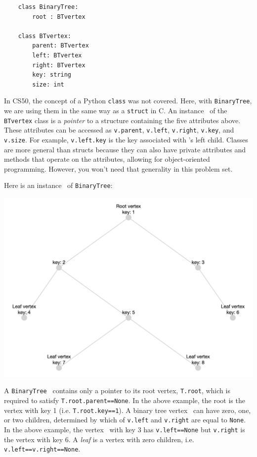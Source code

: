 \documentclass[11pt]{article}
\begin{document}
\begin{enumerate}
 \begin{verbatim}
    class BinaryTree:
        root : BTvertex
 
    class BTvertex:
        parent: BTvertex
        left: BTvertex
        right: BTvertex
        key: string
        size: int
 \end{verbatim}

 In CS50, the concept of a Python \texttt{class} was not covered. Here, with \texttt{BinaryTree}, we are using them in the same way as a \texttt{struct} in C. An instance \btv\  of the \texttt{BTvertex} class is a {\em pointer} to a structure containing the five attributes above. These attributes can be accessed as \texttt{v.parent}, \texttt{v.left}, \texttt{v.right}, \texttt{v.key}, and \texttt{v.size}. 
 For example, \texttt{v.left.key} is the key associated with \btv's left child.  
 Classes are more general than structs because they can also have private attributes and methods that operate on the attributes, allowing for object-oriented programming. However, you won't need that generality in this problem set.

 Here is an instance \treeT\ of \texttt{BinaryTree}:
 
 \includegraphics[scale=.175]{ps0_assets/p0_q1_BT_before.png}

 A \texttt{BinaryTree} \treeT\  contains only a pointer to its root vertex, \texttt{T.root}, which is required to satisfy \texttt{T.root.parent==None}. In the above example, 
 the root is the vertex with key 1 (i.e. \texttt{T.root.key==1}).
 A binary tree vertex \btv\ can have zero, one, or two children, determined by which of \texttt{v.left} and  \texttt{v.right} are equal to \texttt{None}.    In the above example, the vertex \btv\ with key 3 has 
 \texttt{v.left==None} but \texttt{v.right} is the vertex with key 6.
 A {\em leaf} is a vertex with zero children, i.e. \texttt{v.left==v.right==None}. 
 

\end{enumerate}
\end{document}
